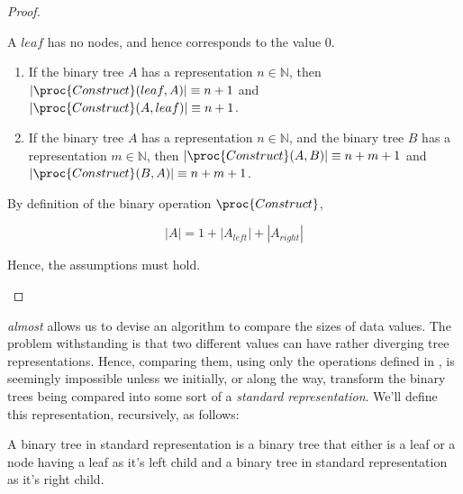 \begin{proof}\ \\

\begin{description}[\setleftmargin{70pt}\setlabelstyle{\bf}]

\item [Base] A $leaf$ has no nodes, and hence corresponds to the value $0$.

\item [Assumption]

\begin{enumerate}

\item If the binary tree $A$ has a representation $n\in\mathbb{N}$, then 
$\left|\proc{Construct}(leaf, A)\right|\equiv n+1$ and
$\left|\proc{Construct}(A, leaf)\right|\equiv n+1$.

\item If the binary tree $A$ has a representation $n\in\mathbb{N}$, and the
binary tree $B$ has a representation $m\in\mathbb{N}$, then
$\left|\proc{Construct}(A,B)\right|\equiv n+m+1$ and
$\left|\proc{Construct}(B,A)\right|\equiv n+m+1$.

\end{enumerate}

\item [Induction]

By definition of the binary operation $\proc{Construct}$,

$$\left|A\right|=1+\left|A_{left}\right|+\left|A_{right}\right|$$

Hence, the assumptions must hold.

\end{description}

\end{proof}

 \emph{almost} allows us to devise an algorithm to
compare the sizes of data values. The problem withstanding is that two
different values can have rather diverging tree representations. Hence,
comparing them, using only the operations defined in
, is seemingly impossible unless we
initially, or along the way, transform the binary trees being compared into
some sort of a \emph{standard representation}. We'll define this
representation, recursively, as follows:

\begin{definition}\label{definition:standard-representation}

A binary tree in standard representation is a binary tree that either is a leaf
or a node having a leaf as it's left child and a binary tree in standard
representation as it's right child.

\end{definition}

